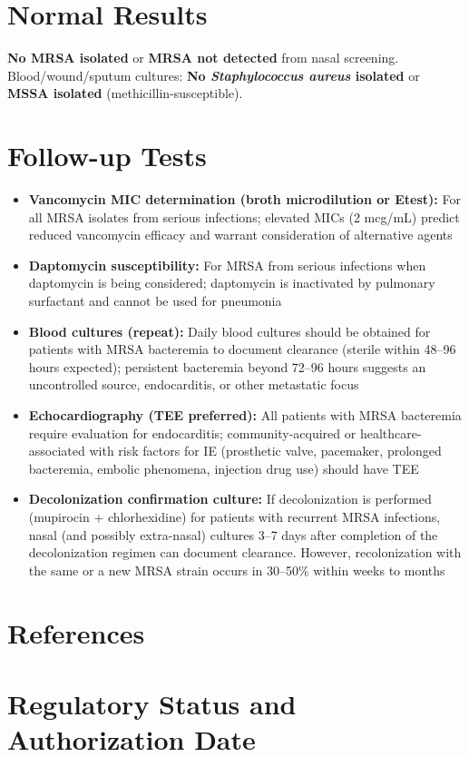 \section*{Normal Results}
\textbf{No MRSA isolated} or \textbf{MRSA not detected} from nasal screening. Blood/wound/sputum cultures: \textbf{No \textit{Staphylococcus aureus} isolated} or \textbf{MSSA isolated} (methicillin-susceptible).

\section*{Follow-up Tests}
\begin{itemize}
  \item \textbf{Vancomycin MIC determination (broth microdilution or Etest):} For all MRSA isolates from serious infections; elevated MICs (2 mcg/mL) predict reduced vancomycin efficacy and warrant consideration of alternative agents
  \item \textbf{Daptomycin susceptibility:} For MRSA from serious infections when daptomycin is being considered; daptomycin is inactivated by pulmonary surfactant and cannot be used for pneumonia
  \item \textbf{Blood cultures (repeat):} Daily blood cultures should be obtained for patients with MRSA bacteremia to document clearance (sterile within 48--96 hours expected); persistent bacteremia beyond 72--96 hours suggests an uncontrolled source, endocarditis, or other metastatic focus
  \item \textbf{Echocardiography (TEE preferred):} All patients with MRSA bacteremia require evaluation for endocarditis; community-acquired or healthcare-associated with risk factors for IE (prosthetic valve, pacemaker, prolonged bacteremia, embolic phenomena, injection drug use) should have TEE
  \item \textbf{Decolonization confirmation culture:} If decolonization is performed (mupirocin + chlorhexidine) for patients with recurrent MRSA infections, nasal (and possibly extra-nasal) cultures 3--7 days after completion of the decolonization regimen can document clearance. However, recolonization with the same or a new MRSA strain occurs in 30--50\% within weeks to months
\end{itemize}

\section*{References}



\clearpage
\section*{Regulatory Status and Authorization Date}

\clearpage
